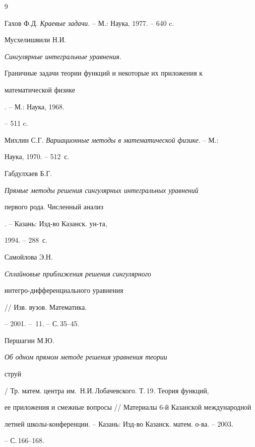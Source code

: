 \begin{thebibliography}{9}







Гахов Ф.Д. {\it Краевые задачи.} -- М.: Наука, 1977. -- 640 c.




Мусхелишвили Н.И. {\it Сингулярные интегральные уравнения.


Граничные задачи теории функций и некоторые их приложения к


математической физике}. -- М.: Наука, 1968.


-- 511 c.




Михлин С.Г. {\it Вариационные методы в математической физике}. -- М.:


Наука, 1970. -- 512~с.




Габдулхаев Б.Г. {\it Прямые методы решения сингулярных интегральных уравнений 


первого рода. Численный анализ}. -- Казань: Изд-во Казанск. ун-та, 


1994. -- 288~с.




Самойлова Э.Н. {\it Сплайновые приближения решения сингулярного 


интегро-дифференциального уравнения} // Изв. вузов. Математика.


-- 2001. -- \No\,11. -- С.\,35--45.




Першагин М.Ю.  {\it Об одном прямом методе решения уравнения теории 


струй} / Тр. матем. центра им.~Н.И.\,Лобачевского. Т.\,19. Теория функций, 


ее приложения и смежные вопросы // Материалы 6-й Казанской международной 


летней школы-конференции. -- Казань: Изд-во Казанск. матем. о-ва. -- 2003.


-- С.\,166--168.





\end{thebibliography}





\vskip 2cm












\label{end}











